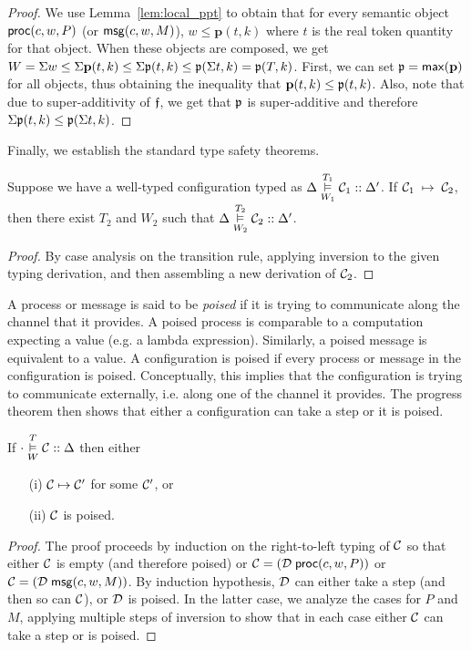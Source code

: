 \begin{proof}
  We use Lemma~\ref{lem:local_ppt} to obtain that for every semantic object $\mathsf{proc}(c, w, P)$ (or $\mathsf{msg}(c, w, M)$),
  $w \leq \mathbf{p}(t, k)$ where $t$ is the real token quantity for that object.
  When these objects are composed, we get $W = \Sigma w \leq \Sigma \mathbf{p}(t, k) \leq \Sigma \mathfrak{p}(t, k) \leq
  \mathfrak{p}(\Sigma t, k) = \mathfrak{p}(T, k)$.
  First, we can set $\mathfrak{p} = \mathsf{max}(\mathbf{p})$ for all objects, thus obtaining the inequality
  that $\mathbf{p}(t, k) \leq \mathfrak{p}(t, k)$.
  Also, note that due to super-additivity of $\mathfrak{f}$, we get that $\mathfrak{p}$ is super-additive
  and therefore $\Sigma \mathfrak{p}(t, k) \leq \mathfrak{p}(\Sigma t, k)$.
\end{proof}

Finally, we establish the standard type safety theorems.

\begin{theorem}
\label{thm:preservation}
Suppose we have a well-typed configuration typed as
$\Delta \overset{T_1}{\underset{W_1}{\vDash}} \mathcal{C}_1 :: \Delta'$.
If $\mathcal{C}_1 \; \mapsto \; \mathcal{C}_2$, then there exist $T_2$ and $W_2$ such
that $\Delta \overset{T_2}{\underset{W_2}{\vDash}} \mathcal{C}_2 :: \Delta'$.
\end{theorem}
\begin{proof}
  By case analysis on the transition rule, applying inversion to the
  given typing derivation, and then assembling a new derivation of
  $\mathcal{C}_2$.
\end{proof}

A process or message is said to be \emph{poised} if it is trying to
communicate along the channel that it provides.  A poised process is
comparable to a computation expecting a value (e.g. a lambda expression).
Similarly, a poised message is equivalent to a value.
A configuration is poised if every process or message in the configuration is poised.
Conceptually, this implies that the configuration is trying to communicate
externally, i.e. along one of the channel it provides.
The progress theorem then shows that either a configuration can take a
step or it is poised.

\begin{theorem}
\label{thm:progress}
\mbox{}
If $\cdot \overset{T}{\underset{W}{\vDash}} \mathcal{C} :: \Delta$ then either
\begin{enumerate}
\item[(i)] $\mathcal{C} \mapsto \mathcal{C}'$ for some $\mathcal{C}'$, or
\item[(ii)] $\mathcal{C}$ is poised.
\end{enumerate}
\end{theorem}
\begin{proof}
The proof proceeds by induction on the right-to-left typing of $\mathcal{C}$ so that either
$\mathcal{C}$ is empty (and therefore poised) or
$\mathcal{C} = (\mathcal{D}\; \mathsf{proc}(c, w, P))$ or
$\mathcal{C} = (\mathcal{D}\; \mathsf{msg}(c, w, M))$. By induction hypothesis, $\mathcal{D}$ can
either take a step (and then so can $\mathcal{C}$), or $\mathcal{D}$ is poised.  In
the latter case, we analyze the cases for $P$ and $M$, applying multiple steps of
inversion to show that in each
case either $\mathcal{C}$ can take a step or is poised.
\end{proof}


